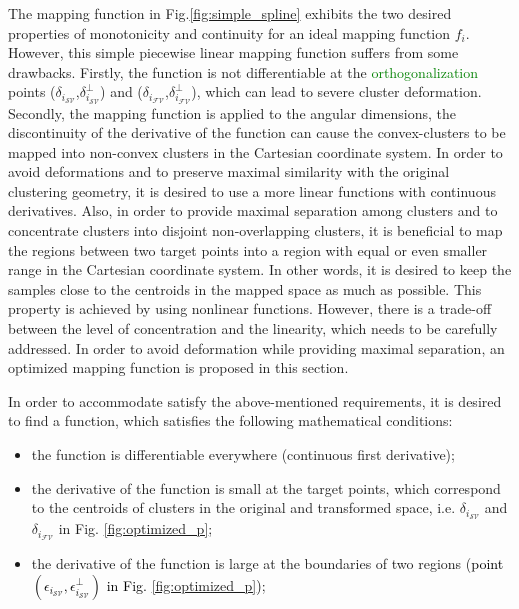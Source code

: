 The mapping function in Fig.\ref{fig:simple_spline} exhibits the two desired properties of monotonicity and continuity for an ideal mapping function $f_i$. However, this simple piecewise linear mapping function suffers from some drawbacks. Firstly, the function is not differentiable at the \textcolor{green}{orthogonalization} points ($\delta_{i_{{\mathcal{SV}}}}$,$\delta^{\perp}_{i_{{\mathcal{SV}}}}$) and ($\delta_{i_{{\mathcal{FV}}}}$,$\delta^{\perp}_{i_{{\mathcal{FV}}}}$), which can lead to severe cluster deformation. Secondly, the mapping function is applied to the angular dimensions, the discontinuity of the derivative of  %
the function can cause the convex-clusters to be mapped into non-convex clusters in the Cartesian coordinate system. In order to avoid deformations and to preserve maximal similarity with the original clustering geometry, it is desired to use a more linear functions with continuous derivatives. Also, in order to provide maximal separation among clusters and to concentrate clusters into disjoint non-overlapping clusters, it is beneficial to map the regions between two target points into a region with equal or even smaller range in the Cartesian coordinate system. In other words, it is desired to keep the samples close to the centroids in the mapped space as much as possible. This property is achieved by using nonlinear functions. However, there is a trade-off between the level of concentration and the linearity, which needs to be carefully addressed.  In order to avoid deformation while providing maximal separation, an optimized mapping function is proposed in this section.

In order to accommodate satisfy the above-mentioned requirements, it is desired to find a function, which satisfies the following mathematical conditions:

\begin{itemize}
\item the function is differentiable everywhere (continuous first derivative);
\item the derivative of the function is small at the target points, which correspond to the centroids of clusters in the original and transformed space, i.e. $\delta_{i_{{\mathcal{SV}}}}$ and $\delta_{i_{{\mathcal{FV}}}}$ in Fig. \ref{fig:optimized_p};
\item the derivative of the function is large at the boundaries of two regions (\textcolor{black}{point $(\epsilon_{i_{{\mathcal{SV}}}},\epsilon^{\perp}_{i_{{\mathcal{SV}}}})$ in Fig. \ref{fig:optimized_p})};
\end{itemize}


